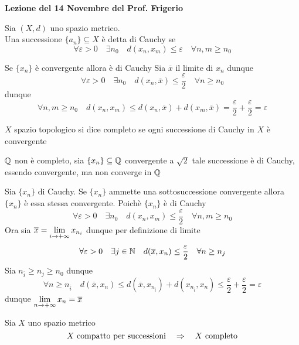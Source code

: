 

\textbf{Lezione del 14 Novembre del Prof. Frigerio}
\begin{defn}\bianco
Sia $(X,d)$ uno spazio metrico.\\
Una successione $\{ a_n\}\subseteq X$ \`e detta di Cauchy se 
$$ \forall \varepsilon>0 \quad \exists n_0 \quad d(x_n, x_m)\leq \varepsilon \quad \forall n,m \geq n_0$$
\end{defn}
\begin{lem}Se $\{ x_n\}$ \`e convergente allora \`e di Cauchy
\proof Sia $\overline{x}$ il limite di $x_n$ dunque 
$$ \forall \varepsilon>0 \quad \exists n_0 \quad d(x_n,\overline{x}) \leq \frac{\varepsilon}{2} \quad \forall n \geq n_0$$
dunque $$\forall n, m \geq n_0 \quad d(x_n,x_m) \leq d(x_n , \overline{x}) + d(x_m, \overline{x}) = \frac{\varepsilon}{2}+ \frac{\varepsilon}{2}=\varepsilon$$
\endproof
\end{lem}
\spazio
\begin{defn}\bianco
$X$ spazio topologico si dice completo se ogni successione di Cauchy in $X$ \`e convergente
\end{defn}
\begin{oss}$\mathbb{Q}$ non \`e completo, sia $\{ x_n \} \subseteq \mathbb{Q} $ convergente a $\sqrt{2}$ tale successione \`e di Cauchy, essendo convergente, ma non converge in $\mathbb{Q}$
\end{oss}
\spazio
\begin{lem}Sia $\{ x_n\}$ di Cauchy. Se $\{ x_n \} $ ammette una sottosuccessione convergente allora $\{ x_n\}$ \`e essa stessa convergente.
\proof Poich\`e $\{ x_n\}$ \`e di Cauchy
$$ \forall \varepsilon>0 \quad \exists n_0 \quad d(x_n, x_m)\leq \frac{\varepsilon}{2} \quad \forall n, m \geq n_0$$
Ora sia $\overline{x}=\displaystyle \lim_{i \to + \infty} x_{n_i}$ dunque per definizione di limite
$$ \forall \varepsilon>0 \quad \exists j \in \mathbb{N}  \quad d (\overline{x}, x_{n})\leq \frac{\varepsilon}{2} \quad \forall n\geq n_j$$
Sia $n_{\overline{i}} \geq n_j \geq n_0$ dunque 
$$ \forall n \geq n_{\overline{i}} \quad d(\overline{x},x_n) \leq d(\overline{x},x_{n_{\overline{i}}})+ d(x_{n_{\overline{i}}},x_n)\leq \frac{\varepsilon}{2}+\frac{\varepsilon}{2}= \varepsilon$$
dunque $\displaystyle \lim_{n\to +\infty} x_n =\overline{x} $
\endproof \end{lem}
\begin{cor}Sia $X$ uno spazio metrico
$$ X \text{ compatto per successioni} \quad \Rightarrow \quad X \text{ completo}$$
\end{cor}
